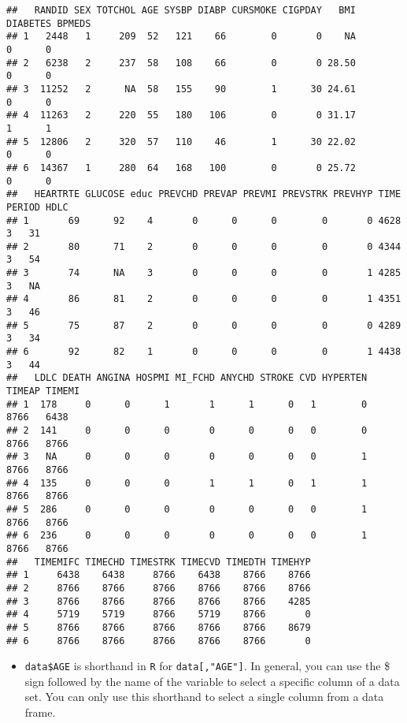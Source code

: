\documentclass[
]{article}
\providecommand{\tightlist}{%
  \setlength{\itemsep}{0pt}\setlength{\parskip}{0pt}}
\begin{document}
\begin{verbatim}
##   RANDID SEX TOTCHOL AGE SYSBP DIABP CURSMOKE CIGPDAY   BMI DIABETES BPMEDS
## 1   2448   1     209  52   121    66        0       0    NA        0      0
## 2   6238   2     237  58   108    66        0       0 28.50        0      0
## 3  11252   2      NA  58   155    90        1      30 24.61        0      0
## 4  11263   2     220  55   180   106        0       0 31.17        1      1
## 5  12806   2     320  57   110    46        1      30 22.02        0      0
## 6  14367   1     280  64   168   100        0       0 25.72        0      0
##   HEARTRTE GLUCOSE educ PREVCHD PREVAP PREVMI PREVSTRK PREVHYP TIME PERIOD HDLC
## 1       69      92    4       0      0      0        0       0 4628      3   31
## 2       80      71    2       0      0      0        0       0 4344      3   54
## 3       74      NA    3       0      0      0        0       1 4285      3   NA
## 4       86      81    2       0      0      0        0       1 4351      3   46
## 5       75      87    2       0      0      0        0       0 4289      3   34
## 6       92      82    1       0      0      0        0       1 4438      3   44
##   LDLC DEATH ANGINA HOSPMI MI_FCHD ANYCHD STROKE CVD HYPERTEN TIMEAP TIMEMI
## 1  178     0      0      1       1      1      0   1        0   8766   6438
## 2  141     0      0      0       0      0      0   0        0   8766   8766
## 3   NA     0      0      0       0      0      0   0        1   8766   8766
## 4  135     0      0      0       1      1      0   1        1   8766   8766
## 5  286     0      0      0       0      0      0   0        1   8766   8766
## 6  236     0      0      0       0      0      0   0        1   8766   8766
##   TIMEMIFC TIMECHD TIMESTRK TIMECVD TIMEDTH TIMEHYP
## 1     6438    6438     8766    6438    8766    8766
## 2     8766    8766     8766    8766    8766    8766
## 3     8766    8766     8766    8766    8766    4285
## 4     5719    5719     8766    5719    8766       0
## 5     8766    8766     8766    8766    8766    8679
## 6     8766    8766     8766    8766    8766       0
\end{verbatim}

\begin{itemize}
\tightlist
\item
  \texttt{data\$AGE} is shorthand in \texttt{R} for
  \texttt{data{[},"AGE"{]}}. In general, you can use the \$ sign
  followed by the name of the variable to select a specific column of a
  data set. You can only use this shorthand to select a single column
  from a data frame.
\end{itemize}
\end{document}
